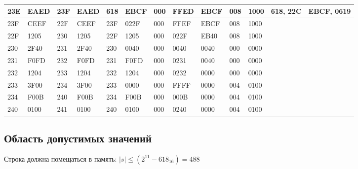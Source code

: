 \begin{table}[!ht]
\begin{tabular}{|l|l|l|l|l|l|l|l|l|l|l|l|l|}
      23E & EAED & 23F & EAED & 618 & EBCF & 000 & FFED & EBCF & 008 & 1000 & 618, 22C & EBCF, 0619 \\ \hline
      23F & CEEF & 22F & CEEF & 23F & 022F & 000 & FFEF & EBCF & 008 & 1000 & ~ & ~ \\ \hline
      22F & 1205 & 230 & 1205 & 22F & 1205 & 000 & 022F & EB40 & 008 & 1000 & ~ & ~ \\ \hline
      230 & 2F40 & 231 & 2F40 & 230 & 0040 & 000 & 0040 & 0040 & 000 & 0000 & ~ & ~ \\ \hline
      231 & F0FD & 232 & F0FD & 231 & F0FD & 000 & 0231 & 0040 & 000 & 0000 & ~ & ~ \\ \hline
      232 & 1204 & 233 & 1204 & 232 & 1204 & 000 & 0232 & 0000 & 000 & 0000 & ~ & ~ \\ \hline
      233 & 3F00 & 234 & 3F00 & 233 & 0000 & 000 & FFFF & 0000 & 004 & 0100 & ~ & ~ \\ \hline
      234 & F00B & 240 & F00B & 234 & F00B & 000 & 000B & 0000 & 004 & 0100 & ~ & ~ \\ \hline
      240 & 0100 & 241 & 0100 & 240 & 0100 & 000 & 0240 & 0000 & 004 & 0100 & ~ & ~ \\ \hline
  \end{tabular}
\end{table}

\subsection{Область допустимых значений}
Строка должна помещаться в память: $|s| \leq (2^11 - 618_{16}) = 488$
